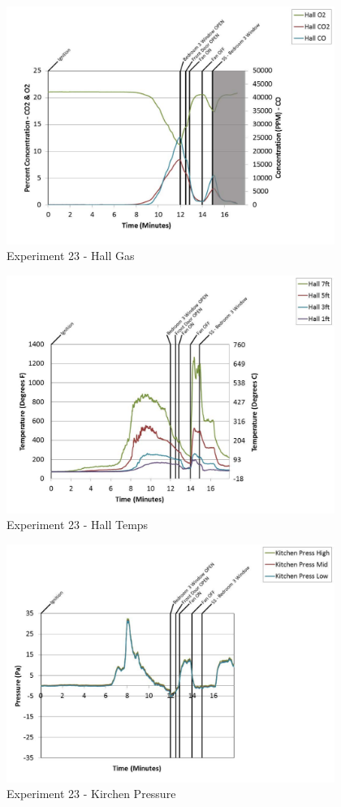 \documentclass{article}
\begin{document}
\begin{appendices}
	\clearpage

	\begin{figure}[h!]
		\centering
		\includegraphics[height=3.05in]{0_Images/Results_Charts/Exp_23_Charts/HallGas.pdf}
		\caption{Experiment 23 - Hall Gas}
	\end{figure}
 

	\begin{figure}[h!]
		\centering
		\includegraphics[height=3.05in]{0_Images/Results_Charts/Exp_23_Charts/HallTemps.pdf}
		\caption{Experiment 23 - Hall Temps}
	\end{figure}
 
	\clearpage

	\begin{figure}[h!]
		\centering
		\includegraphics[height=3.05in]{0_Images/Results_Charts/Exp_23_Charts/KirchenPressure.pdf}
		\caption{Experiment 23 - Kirchen Pressure}
	\end{figure}
 


\end{appendices}
\end{document}
